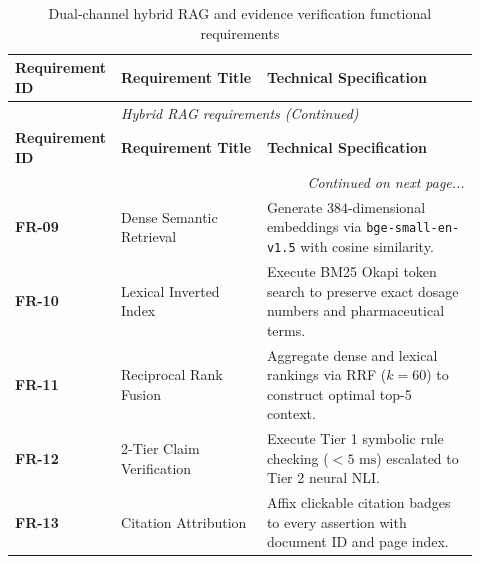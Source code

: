 \small
\begin{longtable}{@{}p{0.16\linewidth} p{0.31\linewidth} p{0.45\linewidth}@{}}
\caption{Dual-channel hybrid RAG and evidence verification functional requirements}\label{tab:3_4_rag_reqs} \\
\toprule
\textbf{Requirement ID} & \textbf{Requirement Title} & \textbf{Technical Specification} \\
\midrule
\endfirsthead
\toprule
\multicolumn{3}{c}{\small\textit{Hybrid RAG requirements (Continued)}} \\[4pt]
\midrule
\textbf{Requirement ID} & \textbf{Requirement Title} & \textbf{Technical Specification} \\
\midrule
\endhead
\midrule
\multicolumn{3}{r}{\footnotesize\textit{Continued on next page...}} \\
\bottomrule
\endfoot
\bottomrule
\endlastfoot
\textbf{FR-09} & Dense Semantic Retrieval & Generate $384$-dimensional embeddings via \texttt{bge-small-en-v1.5} with cosine similarity. \\
\midrule
\textbf{FR-10} & Lexical Inverted Index & Execute BM25 Okapi token search to preserve exact dosage numbers and pharmaceutical terms. \\
\midrule
\textbf{FR-11} & Reciprocal Rank Fusion & Aggregate dense and lexical rankings via RRF ($k=60$) to construct optimal top-5 context. \\
\midrule
\textbf{FR-12} & 2-Tier Claim Verification & Execute Tier 1 symbolic rule checking ($<5\text{ ms}$) escalated to Tier 2 neural NLI. \\
\midrule
\textbf{FR-13} & Citation Attribution & Affix clickable citation badges to every assertion with document ID and page index. \\
\bottomrule
\end{longtable}
\normalsize

